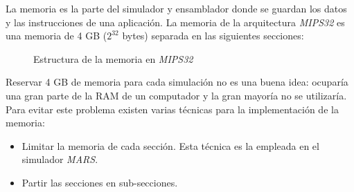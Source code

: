 La memoria es la parte del simulador y ensamblador
donde se guardan los datos y las instrucciones de una aplicación.
La memoria de la arquitectura \textit{MIPS32} es una memoria de 4 GB
($2^{32}$ bytes) separada en las siguientes secciones:

\begin{figure}[H]
    \centering
    \caption{Estructura de la memoria en \textit{MIPS32}}
    \label{fig:memory-table}
\end{figure}

Reservar 4 GB de memoria para cada simulación no es una buena idea:
ocuparía una gran parte de la RAM de un computador y la gran mayoría no se utilizaría.
Para evitar este problema existen varias técnicas para la
implementación de la memoria:
\begin{itemize}
    \item Limitar la memoria de cada sección.
    Esta técnica es la empleada en el simulador \textit{MARS}.
    \item Partir las secciones en sub-secciones.
\end{itemize}

